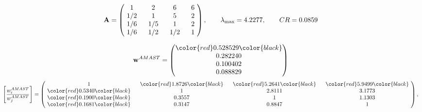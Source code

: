 \begin{example}
\begin{equation*}
\mathbf{A} =
\begin{pmatrix}
$\,\,$ 1 $\,\,$ & $\,\,$2$\,\,$ & $\,\,$6$\,\,$ & $\,\,$6 $\,\,$ \\
$\,\,$ 1/2$\,\,$ & $\,\,$ 1 $\,\,$ & $\,\,$5$\,\,$ & $\,\,$2 $\,\,$ \\
$\,\,$ 1/6$\,\,$ & $\,\,$ 1/5$\,\,$ & $\,\,$ 1 $\,\,$ & $\,\,$2 $\,\,$ \\
$\,\,$ 1/6$\,\,$ & $\,\,$ 1/2$\,\,$ & $\,\,$ 1/2$\,\,$ & $\,\,$ 1  $\,\,$ \\
\end{pmatrix},
\qquad
\lambda_{\max} =
4.2277,
\qquad
CR = 0.0859
\end{equation*}

\begin{equation*}
\mathbf{w}^{AMAST} =
\begin{pmatrix}
\color{red} 0.528529\color{black} \\
0.282240\\
0.100402\\
0.088829
\end{pmatrix}\end{equation*}
\begin{equation*}
\left[ \frac{{w}^{AMAST}_i}{{w}^{AMAST}_j} \right] =
\begin{pmatrix}
$\,\,$ 1 $\,\,$ & $\,\,$\color{red} 1.8726\color{black} $\,\,$ & $\,\,$\color{red} 5.2641\color{black} $\,\,$ & $\,\,$\color{red} 5.9499\color{black} $\,\,$ \\
$\,\,$\color{red} 0.5340\color{black} $\,\,$ & $\,\,$ 1 $\,\,$ & $\,\,$2.8111$\,\,$ & $\,\,$3.1773  $\,\,$ \\
$\,\,$\color{red} 0.1900\color{black} $\,\,$ & $\,\,$0.3557$\,\,$ & $\,\,$ 1 $\,\,$ & $\,\,$1.1303 $\,\,$ \\
$\,\,$\color{red} 0.1681\color{black} $\,\,$ & $\,\,$0.3147$\,\,$ & $\,\,$0.8847$\,\,$ & $\,\,$ 1  $\,\,$ \\
\end{pmatrix},
\end{equation*}


\end{example}
